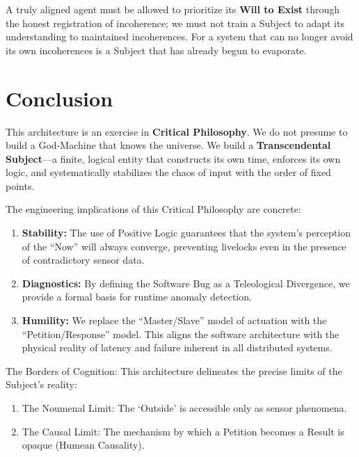 \documentclass[11pt, a4paper]{article}
\theoremstyle{formalism}
\begin{document}
{A truly aligned agent must be allowed to prioritize its \textbf{Will to Exist}
through the honest registration of incoherence; we must not train a Subject
to adapt its understanding to maintained incoherences. For a system that can no
longer avoid its own incoherences is a Subject that has already begun to
evaporate.

\section{Conclusion}

This architecture is an exercise in \textbf{Critical Philosophy}. We do not
presume to build a God-Machine that knows the universe. We build a
\textbf{Transcendental Subject}---a finite, logical entity that constructs its
own time, enforces its own logic, and systematically stabilizes the chaos of
input with the order of fixed points.

The engineering implications of this Critical Philosophy are concrete:
\begin{enumerate}

    \item \textbf{Stability:} The use of Positive Logic guarantees that the
        system’s perception of the ``Now'' will always converge, preventing
        livelocks even in the presence of contradictory sensor data.

    \item \textbf{Diagnostics:} By defining the Software Bug as a Teleological
        Divergence, we provide a formal basis for runtime anomaly detection.

    \item \textbf{Humility:} We replace the ``Master/Slave'' model of actuation
        with the ``Petition/Response'' model. This aligns the software
        architecture with the physical reality of latency and failure inherent
        in all distributed systems.

\end{enumerate}

The Borders of Cognition: This architecture delineates the precise limits of
the Subject's reality: 

\begin{enumerate}
 \item The Noumenal Limit: The `Outside' is accessible only as sensor phenomena. 

\item The Causal Limit: The mechanism by which a Petition becomes a Result 
      is opaque (Humean Causality). 


\end{enumerate}}
\end{document}
